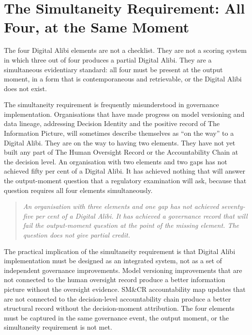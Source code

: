 \scenebreak

\section{The Simultaneity Requirement: All Four, at the Same Moment}

The four Digital Alibi elements are not a checklist. They are not a scoring system in which three out of four produces a partial Digital Alibi. They are a simultaneous evidentiary standard: all four must be present at the output moment, in a form that is contemporaneous and retrievable, or the Digital Alibi does not exist.

The simultaneity requirement is frequently misunderstood in governance implementation. Organisations that have made progress on model versioning and data lineage, addressing Decision Identity and the positive record of The Information Picture, will sometimes describe themselves as ``on the way'' to a Digital Alibi. They are on the way to having two elements. They have not yet built any part of The Human Oversight Record or the Accountability Chain at the decision level. An organisation with two elements and two gaps has not achieved fifty per cent of a Digital Alibi. It has achieved nothing that will answer the output-moment question that a regulatory examination will ask, because that question requires all four elements simultaneously.

\begin{quote}
\emph{An organisation with three elements and one gap has not achieved seventy-five per cent of a Digital Alibi. It has achieved a governance record that will fail the output-moment question at the point of the missing element. The question does not give partial credit.}
\end{quote}

The practical implication of the simultaneity requirement is that Digital Alibi implementation must be designed as an integrated system, not as a set of independent governance improvements. Model versioning improvements that are not connected to the human oversight record produce a better information picture without the oversight evidence. SM\&CR accountability map updates that are not connected to the decision-level accountability chain produce a better structural record without the decision-moment attribution. The four elements must be captured in the same governance event, the output moment, or the simultaneity requirement is not met.

\scenebreak

